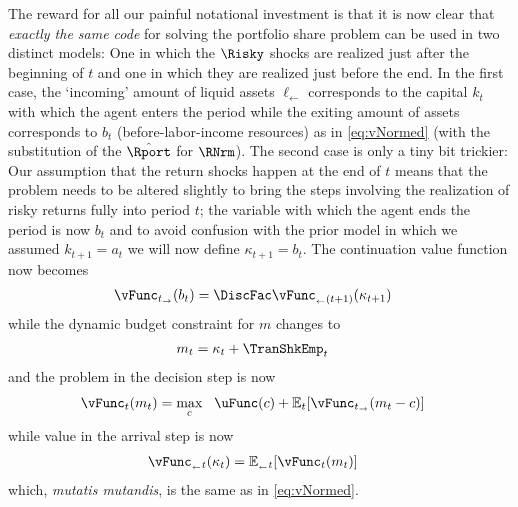 \documentclass[titlepage, headings=optiontotocandhead]{Resources/texmf-local/tex/latex/econtex}
\begin{document}
The reward for all our painful notational investment is that it is now clear that \emph{exactly the same code} for solving the portfolio share problem can be used in two distinct models: One in which the $\Risky$ shocks are realized just after the beginning of $t$ and one in which they are realized just before the end. In the first case, the `incoming' amount of liquid assets $\ell_{\leftarrow}$ corresponds to the capital $k_{t}$ with which the agent enters the period while the exiting amount of assets corresponds to $b_{t}$ (before-labor-income resources) as in \eqref{eq:vNormed} (with the substitution of the $\hat{\Rport}$ for $\RNrm$).  The second case is only a tiny bit trickier: Our assumption that the return shocks happen at the end of $t$ means that the problem needs to be altered slightly to bring the steps involving the realization of risky returns fully into period $t$; the variable with which the agent ends the period is now ${b}_{t}$ and to avoid confusion with the prior model in which we assumed ${k}_{t+1}={a}_{t}$ we will now define $\kappa_{t+1}={b}_{t}$.  The continuation value function now becomes
\begin{equation}\begin{gathered}\begin{aligned}
      \vFunc_{t_\rightarrow}({{b}}_{t}) & = \DiscFac \vFunc_{_\leftarrow(t+1)}({\kappa}_{t+1})
    \end{aligned}\end{gathered}\end{equation}
while the dynamic budget constraint for ${m}$ changes to
\begin{equation}\begin{gathered}\begin{aligned}
      {m}_{t} & = {\kappa}_{t}+\TranShkEmp_{t}
    \end{aligned}\end{gathered}\end{equation}
and the problem in the decision step is now
\begin{equation}\begin{gathered}\begin{aligned}
      \vFunc_{t}({m}_{t}) & = \max_{{c}}~~\uFunc({c})+\Ex_{t}[\vFunc_{t_\rightarrow}({m}_{t}-{{c}})]
    \end{aligned}\end{gathered}\end{equation}
while value in the arrival step is now
\begin{equation}\begin{gathered}\begin{aligned}
      \vFunc_{_\leftarrow t}({\kappa}_{t}) & = \Ex_{_\leftarrow t}[\vFunc_{t}({m}_{t})]
    \end{aligned}\end{gathered}\end{equation}
which, \textit{mutatis mutandis}, is the same as in \eqref{eq:vNormed}.
\end{document}
